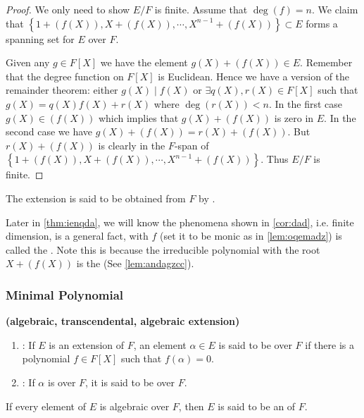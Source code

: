 \documentclass{article}
\newcommand{\bfs}[1]{\textbf{({#1}) }}
\begin{document}
\begin{proof}
We only need to show $E/F$ is finite. Assume that $\operatorname{deg}(f)=n$. We claim that $\left\{1+(f(X)), X+(f(X)), \cdots, X^{n-1}+(f(X))\right\} \subset E$ forms a spanning set for $E$ over $F$.

Given any $g \in F[X]$ we have the element $g(X)+(f(X)) \in E$. Remember that the degree function on $F[X]$ is Euclidean. Hence we have a version of the remainder theorem: either $g(X) \mid f(X)$ or $\exists q(X), r(X) \in F[X]$ such that $g(X)=q(X) f(X)+r(X)$ where $\operatorname{deg}(r(X))<n$. In the first case $g(X) \in(f(X))$ which implies that $g(X)+(f(X))$ is zero in $E$. In the second case we have $g(X)+(f(X))=r(X)+(f(X))$. But $r(X)+(f(X))$ is clearly in the $F$-span of $\left\{1+(f(X)), X+(f(X)), \cdots, X^{n-1}+(f(X))\right\}$. Thus $E / F$ is finite.
\end{proof}
\begin{rema}\label{rem:oqnsdaddf}
The extension is said to be obtained from $F$ by . 

Later in \cref{thm:ienqda},  we will know the phenomena shown in \cref{cor:dad}, i.e. finite dimension, is a general fact, with $f$ (set it to be monic as in \cref{lem:oqemadz}) is called the . Note this is because the  irreducible polynomial with the root $X+(f(X))$ is the  (See \cref{lem:andagzcc}).
\end{rema}
\subsubsection{Minimal Polynomial}
\begin{defa}\bfs{algebraic, transcendental, algebraic extension}
\begin{enumerate}
    \item {}: If $E$ is an extension of $F$, an element $\alpha \in E$ is said to be  over $F$ if there is a  polynomial $f \in F[X]$ such that $f(\alpha)=0$.
    \item {}: If $\alpha$ is  over $F$, it is said to be  over $F$. 
\end{enumerate}
 If every element of $E$ is algebraic over $F$, then $E$ is said to be an  of $F$.
\end{defa}
\end{document}
